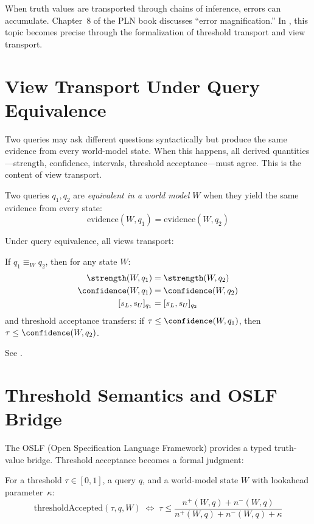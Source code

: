 \documentclass[11pt,openany]{report}
\begin{document}
When truth values are transported through chains of inference, errors can
accumulate.  Chapter~8 of the PLN book discusses ``error magnification.''
In \xiPLN{}, this topic becomes precise through the formalization of
threshold transport and view transport.

\section{View Transport Under Query Equivalence}

Two queries may ask different questions syntactically but produce the
same evidence from every world-model state.  When this happens, all
derived quantities---strength, confidence, intervals, threshold
acceptance---must agree.  This is the content of view transport.

\begin{definition}
Two queries $q_1, q_2$ are \emph{equivalent in a world model $W$} when
they yield the same evidence from every state:
\[
  \mathrm{evidence}(W, q_1) = \mathrm{evidence}(W, q_2)
\]
\end{definition}

Under query equivalence, all views transport:

\begin{theorem}
If $q_1 \equiv_W q_2$, then for any state $W$:
\begin{align}
  \strength(W, q_1) &= \strength(W, q_2) \\
  \confidence(W, q_1) &= \confidence(W, q_2) \\
  [s_L, s_U]_{q_1} &= [s_L, s_U]_{q_2}
\end{align}
and threshold acceptance transfers: if $\tau \le \confidence(W, q_1)$,
then $\tau \le \confidence(W, q_2)$.
\end{theorem}

See .

\section{Threshold Semantics and OSLF Bridge}

The OSLF (Open Specification Language Framework) provides a typed
truth-value bridge.  Threshold acceptance becomes a formal judgment:

\begin{definition}
For a threshold $\tau \in [0,1]$, a query $q$, and a world-model state $W$
with lookahead parameter~$\kappa$:
\[
  \mathrm{thresholdAccepted}(\tau, q, W) \;\iff\;
  \tau \le \frac{n^+(W, q) + n^-(W, q)}{n^+(W, q) + n^-(W, q) + \kappa}
\]
\end{definition}
\end{document}
